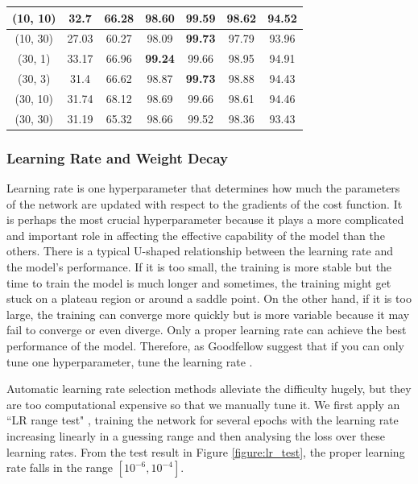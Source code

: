 \documentclass[a4paper,12pt]{article}
\begin{document}
\begin{table}[H]
{\begin{tabular}{|c|c|c|c|c|c|c|}
			(10, 10) & 32.7 & 66.28 & 98.60 & 99.59 & 98.62 & 94.52 \\ \hline
			(10, 30) & 27.03 & 60.27 & 98.09 & \textbf{99.73} & 97.79 & 93.96 \\ \hline
			(30, 1) & 33.17 & 66.96 & \textbf{99.24} & 99.66 & 98.95 & 94.91 \\ \hline
			(30, 3) & 31.4 & 66.62 & 98.87 & \textbf{99.73} & 98.88 & 94.43 \\ \hline
			(30, 10) & 31.74 & 68.12 & 98.69 & 99.66 & 98.61 & 94.46 \\ \hline
			(30, 30) & 31.19 & 65.32 & 98.66 & 99.52 & 98.36 & 93.43 \\ \hline
		\end{tabular}%
	}
\end{table}


\subsubsection{Learning Rate and Weight Decay}

Learning rate is one hyperparameter that determines how much the parameters of the network are updated with respect to the gradients of the cost function. It is perhaps the most crucial hyperparameter because it plays a more complicated and important role in affecting the effective capability of the model than the others. There is a typical U-shaped relationship between the learning rate and the model's performance. If it is too small, the training is more stable but the time to train the model is much longer and sometimes, the training might get stuck on a plateau region or around a saddle point. On the other hand, if it is too large, the training can converge more quickly but is more variable because it may fail to converge or even diverge. Only a proper learning rate can achieve the best performance of the model. Therefore, as Goodfellow \etal suggest that if you can only tune one hyperparameter, tune the learning rate \cite{Goodfellow-et-al-2016}.

Automatic learning rate selection methods alleviate the difficulty hugely, but they are too computational expensive so that we manually tune it. We first apply an ``LR range test" \cite{DBLP:journals/corr/Smith15a}, training the network for several epochs with the learning rate increasing linearly in a guessing range and then analysing the loss over these learning rates. From the test result in Figure \ref{figure:lr_test}, the proper learning rate falls in the range $[10^{-6}, 10^{-4}]$. 
\end{document}
